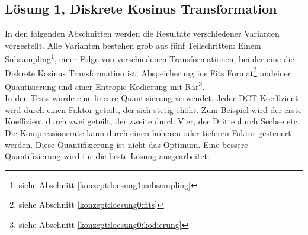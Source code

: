 \subsection{Lösung 1, Diskrete Kosinus Transformation}
In den folgenden Abschnitten werden die Resultate verschiedener Varianten vorgestellt. Alle Varianten bestehen grob aus fünf Teilschritten: Einem Subsampling\footnote{siehe Abschnitt \ref{konzept:loesung1:subsampling}}, einer Folge von verschiedenen Transformationen, bei der eine die Diskrete Kosinus Transformation ist, Abspeicherung ins Fits Format\footnote{siehe Abschnitt \ref{konzept:loesung0:fits}} undeiner Quantisierung und einer Entropie Kodierung mit Rar\footnote{siehe Abschnitt \ref{konzept:loesung0:kodierung}}.\\
[\baselineskip]
In den Tests wurde eine lineare Quantisierung verwendet. Jeder DCT Koeffizient wird durch einen Faktor geteilt, der sich stetig ehöht. Zum Beispiel wird der erste Koeffizient durch zwei geteilt, der zweite durch Vier, der Dritte durch Sechse etc.  Die Kompressionsrate kann durch einen höheren oder tieferen Faktor gesteuert werden. Diese Quantifizierung ist nicht das Optimum. Eine bessere Quantifizierung wird für die beste Lösung ausgearbeitet.

